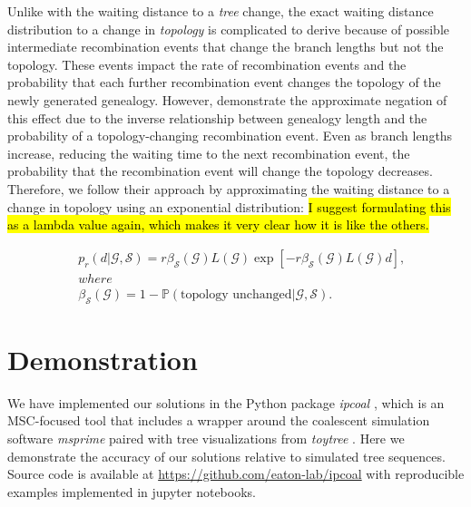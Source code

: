 \documentclass[11pt]{article}
\begin{document}
Unlike with the waiting distance to a \emph{tree} change, the exact waiting distance 
distribution to a change in \emph{topology} is complicated to derive because of 
possible intermediate recombination events that change the branch lengths but not 
the topology. These events impact the rate of recombination events and the probability
that each further recombination event changes the topology of the newly generated 
genealogy. However, \citet{deng_distribution_2021} demonstrate the approximate 
negation of this effect due to the inverse relationship between genealogy length
and the probability of a topology-changing recombination event. Even as branch 
lengths increase, reducing the waiting time to the next recombination event, the
probability that the recombination event will change the topology decreases. 
Therefore, we follow their approach by approximating the waiting distance to
a change in topology using an exponential distribution:
\noindent\hl{I suggest formulating this as a lambda value again, which makes it 
very clear how it is like the others.}

\begin{equation}
\begin{aligned}
	&p_r(d|\mathcal{G},\mathcal{S}) = r\beta_\mathcal{S}(\mathcal{G})L(\mathcal{G})\exp\left[-r\beta_\mathcal{S}(\mathcal{G})L(\mathcal{G})d\right]\textrm{,} \\
	&where \\
	&\beta_\mathcal{S}(\mathcal{G})=1-\mathbb{P}(\textrm{topology unchanged} | \mathcal{G},\mathcal{S}).
\end{aligned}
\end{equation}

\section{Demonstration}

We have implemented our solutions in the Python package \emph{ipcoal} 
\citep{mckenzie_ipcoal_2020}, which is an MSC-focused tool that includes
a wrapper around the coalescent simulation software \emph{msprime}
\citep{baumdicker_efficient_2022} paired with tree visualizations from
\emph{toytree} \citep{eaton_toytree_2020}. 
Here we demonstrate
the accuracy of our solutions relative to simulated tree sequences.
Source code is available at \url{https://github.com/eaton-lab/ipcoal}
with reproducible examples implemented in jupyter notebooks.
\end{document}
